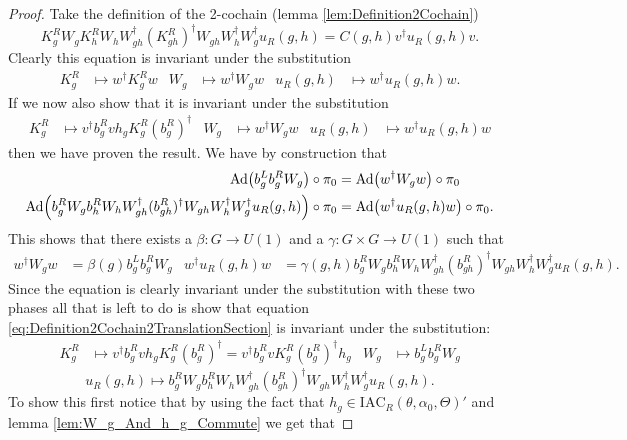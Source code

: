 \documentclass[12pt,a4paper,twoside]{article}
\newcommand{\IAC}{\textrm{IAC}}
\let\originalleft\left
\let\originalright\right
\renewcommand{\left}{\mathopen{}\mathclose\bgroup\originalleft}
\renewcommand{\right}{\aftergroup\egroup\originalright}
\newcommand{\Ad}[1]{\textrm{Ad}\left(#1\right)}
\theoremstyle{definition}
\numberwithin{equation}{section}
\begin{document}
\begin{proof}
	Take the definition of the 2-cochain (lemma \ref{lem:Definition2Cochain})
	\begin{equation}\label{eq:Definition2Cochain2TranslationSection}
		K_g^RW_gK_h^RW_hW_{gh}^\dagger(K_{gh}^R)^\dagger W_{gh}W_{h}^\dagger W_g^\dagger u_R(g,h)=C(g,h)v^\dagger u_R(g,h)v.
	\end{equation}
	Clearly this equation is invariant under the substitution
	\begin{align}
		K_g^R&\mapsto w^\dagger K_g^R w&W_g&\mapsto w^\dagger W_g w&u_R(g,h)&\mapsto w^\dagger u_R(g,h)w.
	\end{align}
	If we now also show that it is invariant under the substitution
	\begin{align}
		K_g^R&\mapsto v^\dagger b_g^R v h_g K_g^R (b_g^R)^\dagger&W_g&\mapsto w^\dagger W_g w&u_R(g,h)&\mapsto w^\dagger u_R(g,h)w
	\end{align}
	then we have proven the result. We have by construction that
	\begin{align}
		\Ad{b_g^Lb_g^RW_g}\circ\pi_0&=\Ad{w^\dagger W_g w}\circ\pi_0\\
		\Ad{b_g^R W_g b_h^R W_h W_{gh}^\dagger (b_{gh}^R)^\dagger W_{gh}W_h^\dagger W_g^\dagger u_R(g,h)}\circ\pi_0&=\Ad{w^\dagger u_R(g,h) w}\circ\pi_0.
	\end{align}
	This shows that there exists a $\beta:G\rightarrow U(1)$ and a $\gamma:G\times G\rightarrow U(1)$ such that
	\begin{align}
		w^\dagger W_g w&=\beta(g)b_g^Lb_g^RW_g&w^\dagger u_R(g,h) w&=\gamma(g,h)b_g^R W_g b_h^R W_h W_{gh}^\dagger (b_{gh}^R)^\dagger W_{gh}W_h^\dagger W_g^\dagger u_R(g,h).
	\end{align}
	Since the equation is clearly invariant under the substitution with these two phases all that is left to do is show that equation \eqref{eq:Definition2Cochain2TranslationSection} is invariant under the substitution:
	\begin{align}
		K_g^R&\mapsto v^\dagger b_g^R v h_g K_g^R (b_g^R)^\dagger=v^\dagger b_g^R v K_g^R (b_g^R)^\dagger h_g&W_g&\mapsto b_g^Lb_g^RW_g
	\end{align}
	\begin{equation}
		u_R(g,h)\mapsto b_g^R W_g b_h^R W_h W_{gh}^\dagger (b_{gh}^R)^\dagger W_{gh}W_h^\dagger W_g^\dagger u_R(g,h).
	\end{equation}
	To show this first notice that by using the fact that $h_g\in\IAC_R(\theta,\alpha_0,\Theta)'$ and lemma \ref{lem:W_g_And_h_g_Commute} we get that

\end{proof}
\end{document}
